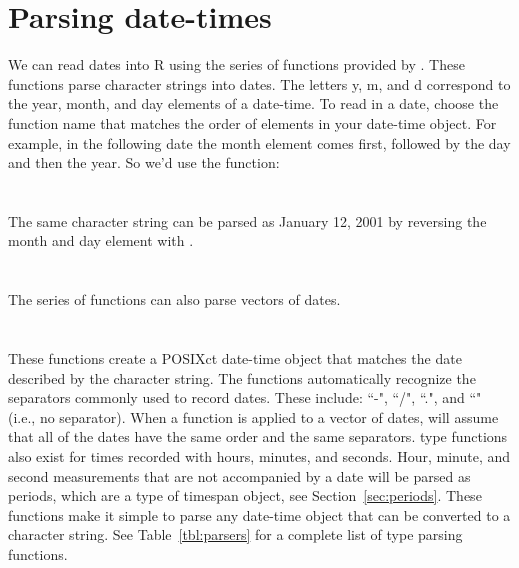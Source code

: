 \documentclass[article]{jss}
\begin{document}





\section{Parsing date-times}
\label{sec:parsing}

We can read dates into R using the  series of functions provided by . These functions parse character strings into dates. The letters y, m, and d correspond to the year, month, and day elements of a date-time. To read in a date, choose the function name that matches the order of elements in your date-time object. For example, in the following date the month element comes first, followed by the day and then the year. So we'd use the  function:\\

\\
\\

The same character string can be parsed as January 12, 2001 by reversing the month and day element with .\\

\\
\\

The  series of functions can also parse vectors of dates.\\

\\
\\


These functions create a POSIXct date-time object that matches the date described by the character string.  The functions automatically recognize the separators commonly used to record dates. These include: ``-", ``/", ``.", and ``" (i.e., no separator).  When a  function is applied to a vector of dates,  will assume that all of the dates have the same order and the same separators.  type functions also exist for times recorded with hours, minutes, and seconds. Hour, minute, and second measurements that are not accompanied by a date will be parsed as periods, which are a type of timespan object, see Section~\ref{sec:periods}. These functions make it simple to parse any date-time object that can be converted to a character string. See Table~\ref{tbl:parsers} for a complete list of  type parsing functions. 
\end{document}
